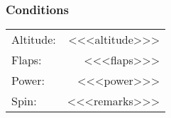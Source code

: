 % 
% 
%
 \subsubsection*{Conditions}
 \noindent\begin{tabular}{p{1.5 in}r}
 Altitude:&<<<altitude>>>\\
 Flaps:&<<<flaps>>>\\
 Power:&<<<power>>>\\
 Spin:&<<<remarks>>>\\
 \end{tabular}
